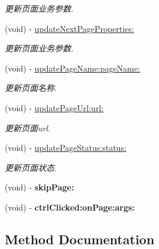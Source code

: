 \begin{DoxyCompactItemize}
\begin{DoxyCompactList}\small\item\em 更新页面业务参数. \end{DoxyCompactList}\item 
(void) -\/ \mbox{\hyperlink{interface_u_t_tracker_ac9d1cca8b1fc2579aa0ad00c312f4188}{update\+Next\+Page\+Properties\+:}}
\begin{DoxyCompactList}\small\item\em 更新页面业务参数. \end{DoxyCompactList}\item 
(void) -\/ \mbox{\hyperlink{interface_u_t_tracker_af0b3ce3574a7cbf78cb880c567f9efa1}{update\+Page\+Name\+:page\+Name\+:}}
\begin{DoxyCompactList}\small\item\em 更新页面名称. \end{DoxyCompactList}\item 
(void) -\/ \mbox{\hyperlink{interface_u_t_tracker_a654369a4fe09d5c85726c32979be941f}{update\+Page\+Url\+:url\+:}}
\begin{DoxyCompactList}\small\item\em 更新页面url. \end{DoxyCompactList}\item 
(void) -\/ \mbox{\hyperlink{interface_u_t_tracker_adbe97e46febcc741a4f498f5511bc822}{update\+Page\+Status\+:status\+:}}
\begin{DoxyCompactList}\small\item\em 更新页面状态. \end{DoxyCompactList}\item 
\mbox{\label{interface_u_t_tracker_a8a87b4cf23700f4c4e8e8b6d49f67825}} 
(void) -\/ {\bfseries skip\+Page\+:}
\item 
\mbox{\label{interface_u_t_tracker_ac84169d024587ce515d2b61b1505c7ee}} 
(void) -\/ {\bfseries ctrl\+Clicked\+:on\+Page\+:args\+:}
\end{DoxyCompactItemize}


\subsection{Method Documentation}
\mbox{\label{interface_u_t_tracker_a6381578aef02a4bc703738d142479a61}} 
